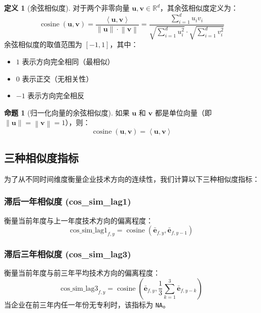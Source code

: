 \documentclass[12pt,a4paper]{article}
\theoremstyle{definition}
\newtheorem{definition}{定义}[section]
\newtheorem{proposition}{命题}[section]
\newcommand{\vect}[1]{\mathbf{#1}}
\newcommand{\norm}[1]{\left\|#1\right\|}
\newcommand{\inner}[2]{\left\langle #1, #2 \right\rangle}
\newcommand{\R}{\mathbb{R}}
\DeclareMathOperator{\cosine}{cosine}
\begin{document}
\begin{definition}[余弦相似度]
对于两个非零向量 $\vect{u}, \vect{v} \in \R^d$，其余弦相似度定义为：
\begin{equation}
    \cosine(\vect{u}, \vect{v}) = \frac{\inner{\vect{u}}{\vect{v}}}{\norm{\vect{u}} \cdot \norm{\vect{v}}} = \frac{\sum_{i=1}^{d} u_i v_i}{\sqrt{\sum_{i=1}^{d} u_i^2} \cdot \sqrt{\sum_{i=1}^{d} v_i^2}}
\end{equation}
余弦相似度的取值范围为 $[-1, 1]$，其中：
\begin{itemize}
    \item $1$ 表示方向完全相同（最相似）
    \item $0$ 表示正交（无相关性）
    \item $-1$ 表示方向完全相反
\end{itemize}
\end{definition}

\begin{proposition}[归一化向量的余弦相似度]
如果 $\vect{u}$ 和 $\vect{v}$ 都是单位向量（即 $\norm{\vect{u}} = \norm{\vect{v}} = 1$），则：
\begin{equation}
    \cosine(\vect{u}, \vect{v}) = \inner{\vect{u}}{\vect{v}}
\end{equation}
\end{proposition}

\subsection{三种相似度指标}

为了从不同时间维度衡量企业技术方向的连续性，我们计算以下三种相似度指标：

\subsubsection{滞后一年相似度 (cos\_sim\_lag1)}

衡量当前年度与上一年度技术方向的偏离程度：
\begin{equation}
    \text{cos\_sim\_lag1}_{f,y} = \cosine(\bar{\vect{e}}_{f,y}, \bar{\vect{e}}_{f,y-1})
\end{equation}

\subsubsection{滞后三年相似度 (cos\_sim\_lag3)}

衡量当前年度与前三年平均技术方向的偏离程度：
\begin{equation}
    \text{cos\_sim\_lag3}_{f,y} = \cosine\left(\bar{\vect{e}}_{f,y}, \frac{1}{3}\sum_{k=1}^{3} \bar{\vect{e}}_{f,y-k}\right)
\end{equation}
当企业在前三年内任一年份无专利时，该指标为 \texttt{NA}。
\end{document}
